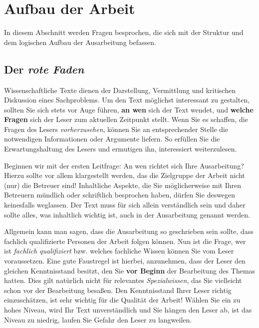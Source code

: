 \section{Aufbau der Arbeit}

In diesem Abschnitt werden Fragen besprochen, die sich mit der Struktur und dem logischen Aufbau der Ausarbeitung befassen.

\subsection{Der \textit{rote Faden}}

Wissenschaftliche Texte dienen der Darstellung, Vermittlung und kritischen Diskussion eines Sachproblems.
Um den Text möglichst interessant zu gestalten, sollten Sie sich stets vor Auge führen, \textbf{an wen} sich der Text wendet, und \textbf{welche Fragen} sich der Leser zum aktuellen Zeitpunkt stellt.
Wenn Sie es schaffen, die Fragen des Lesers \textit{vorherzusehen}, können Sie an entsprechender Stelle die notwendigen Informationen oder Argumente liefern.
So erfüllen Sie die Erwartungshaltung des Lesers und ermutigen ihn, interessiert weiterzulesen.

Beginnen wir mit der ersten Leitfrage: An wen richtet sich Ihre Ausarbeitung?
Hierzu sollte vor allem klargestellt werden, das die Zielgruppe der Arbeit nicht (nur) die Betreuer sind!
Inhaltliche Aspekte, die Sie möglicherweise mit Ihren Betreuern mündlich oder schriftlich besprochen haben, dürfen Sie deswegen keinesfalls weglassen.
Der Text muss für sich allein verständlich sein und daher sollte alles, was inhaltlich wichtig ist, auch in der Ausarbeitung genannt werden.

Allgemein kann man sagen, dass die Ausarbeitung so geschrieben sein sollte, dass fachlich qualifizierte Personen der Arbeit folgen können.
Nun ist die Frage, wer ist \textit{fachlich qualifiziert} bzw. welches fachliche Wissen können Sie vom Leser voraussetzen.
Eine gute Faustregel ist hierbei, anzunehmen, dass der Leser den gleichen Kenntnisstand besitzt, den Sie \textbf{vor Beginn} der Bearbeitung des Themas hatten.
Dies gilt natürlich nicht für relevantes \textit{Spezialwissen}, das Sie vielleicht schon vor der Bearbeitung besaßen.
Den Kenntnisstand Ihrer Leser richtig einzuschätzen, ist sehr wichtig für die Qualität der Arbeit!
Wählen Sie ein zu hohes Niveau, wird Ihr Text unverständlich und Sie hängen den Leser ab, ist das Niveau zu niedrig, laufen Sie Gefahr den Leser zu langweilen.

